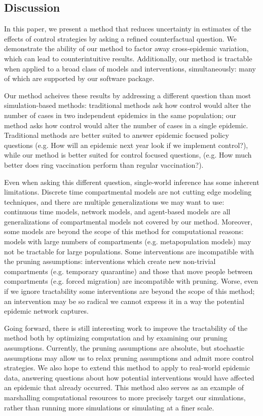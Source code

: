 \documentclass[PTRSB]{rsos}
\begin{document}
\begin{multicols}{2}
\section{Discussion}
In this paper, we present a method that reduces uncertainty in estimates of the effects of control strategies by asking a refined counterfactual question.
We demonstrate the ability of our method to factor away cross-epidemic variation, which can lead to counterintuitive results.
Additionally, our method is tractable when applied to a broad class of models and interventions, simultaneously: many of which are supported by our software package.

Our method acheives these results by addressing a different question than most simulation-based methods: traditional methods ask how control would alter the number of cases in two independent epidemics in the same population; our method asks how control would alter the number of cases in a single epidemic.
Traditional methods are better suited to answer epidemic focused policy questions (e.g. How will an epidemic next year look if we implement control?), while our method is better suited for control focused questions, (e.g. How much better does ring vaccination perform than regular vaccination?).

Even when asking this different question, single-world inference has some inherent limitations.
Discrete time compartmental models are not cutting edge modeling techniques, and there are multiple generalizations we may want to use: continuous time models, network models, and agent-based models are all generalizations of compartmental models not covered by our method.
Moreover, some models are beyond the scope of this method for computational reasons: models with large numbers of compartments (e.g. metapopulation models) may not be tractable for large populations.
Some interventions are incompatible with the pruning assumptions: interventions which create new non-trivial compartments (e.g. temporary quarantine) and those that move people between compartments (e.g. forced migration) are incompatible with pruning.
Worse, even if we ignore tractability some interventions are beyond the scope of this method; an intervention may be so radical we cannot express it in a way the potential epidemic network captures.

Going forward, there is still interesting work to improve the tractability of the method both by optimizing computation and by examining our pruning assumptions.
Currently, the pruning assumptions are absolute, but stochastic assumptions may allow us to relax pruning assumptions and admit more control strategies.
We also hope to extend this method to apply to real-world epidemic data, answering questions about how potential interventions would have affected an epidemic that already occurred.
This method also serves as an example of marshalling computational resources to more precisely target our simulations, rather than running more simulations or simulating at a finer scale.


\end{multicols}
\end{document}
